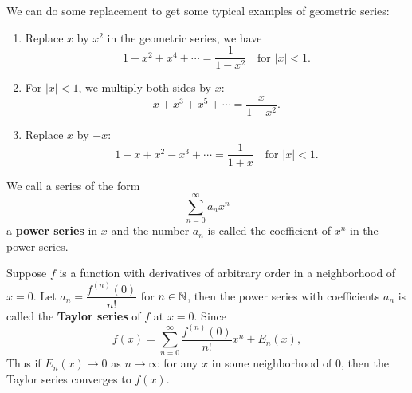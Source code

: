 \documentclass[a4paper]{ctexart}
\begin{document}
    \begin{myex}
        We can do some replacement to get some typical examples of geometric series:
        \begin{enumerate}[label=(\arabic*)]
            \item Replace $x$ by $x^2$ in the geometric series, we have
            \[
            1+ x^2 + x^4 + \cdots = \frac{1}{1-x^2} \quad \text{for } |x|<1.
            \]
            \item For $|x|<1$, we multiply both sides by $x$:
            \[
            x + x^3 + x^5 + \cdots = \frac{x}{1-x^2}.
            \]
            \item Replace $x$ by $-x$:
            \[
            1 - x + x^2 - x^3 + \cdots = \frac{1}{1+x} \quad \text{for } |x|<1.
            \]
        \end{enumerate}
    \end{myex}
    \begin{mydef}\label{def:power-series}
        We call a series of the form
        \[
        \sum_{n=0}^\infty a_n x^n
        \]
        a \textbf{power series} in $x$ and the number $a_n$ is called the coefficient of $x^n$ in the power series.
    \end{mydef}
    \begin{myex}
        Suppose $f$ is a function with derivatives of arbitrary order in a neighborhood of $x=0$. Let $a_n = \dfrac{f^{(n)}(0)}{n!}$ for $n\in \mathbb{N}$, then the power series with coefficients $a_n$ is called the \textbf{Taylor series} of $f$ at $x=0$. Since
        \[
        f(x) = \sum_{n=0}^\infty \frac{f^{(n)}(0)}{n!} x^n + E_n(x),
        \]
        Thus if $E_n(x) \to 0$ as $n\to \infty$ for any $x$ in some neighborhood of $0$, then the Taylor series converges to $f(x)$.
    \end{myex}
\end{document}
